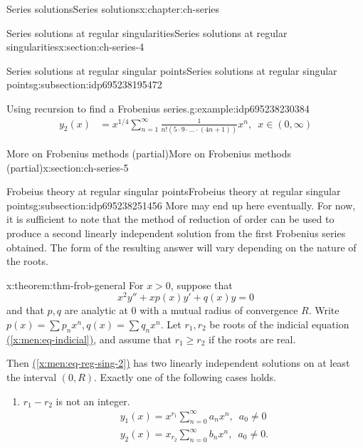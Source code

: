 \documentclass[oneside,10pt,]{book}
\newcommand{\xreffont}{\relax}
\numberwithin{equation}{section}
\numberwithin{equation}{section}
\newcommand{\amp}{&}
\begin{document}
\begin{chapterptx}{Series solutions}{}{Series solutions}{}{}{x:chapter:ch-series}
\begin{sectionptx}{Series solutions at regular singularities}{}{Series solutions at regular singularities}{}{}{x:section:ch-series-4}
\begin{subsectionptx}{Series solutions at regular singular points}{}{Series solutions at regular singular points}{}{}{g:subsection:idp695238195472}
\begin{example}{Using recursion to find a Frobenius series.}{g:example:idp695238230384}
\begin{align*}
y_2(x) \amp = x^{1/4} \sum_{n=1}^\infty \frac{1}{n!(5 \cdot 9 \cdot \ldots \cdot (4n + 1))} x^n, \,\,\, x \in (0,\infty)
\end{align*}
%
\end{example}
\end{subsectionptx}
\end{sectionptx}
%
%
\typeout{************************************************}
\typeout{************************************************}
%
\begin{sectionptx}{More on Frobenius methods (partial)}{}{More on Frobenius methods (partial)}{}{}{x:section:ch-series-5}
%
%
\typeout{************************************************}
\typeout{************************************************}
%
\begin{subsectionptx}{Frobeius theory at regular singular points}{}{Frobeius theory at regular singular points}{}{}{g:subsection:idp695238251456}
More may end up here eventually. For now, it is sufficient to note that the method of reduction of order can be used to produce a second linearly independent solution from the first Frobenius series obtained. The form of the resulting answer will vary depending on the nature of the roots.%
\begin{theorem}{}{}{x:theorem:thm-frob-general}%
For \(x > 0\), suppose that%
\begin{equation}
x^2 y'' + xp(x)y' + q(x)y = 0\label{x:men:eq-reg-sing-2}
\end{equation}
and that \(p, q\) are analytic at 0 with a mutual radius of convergence \(R\). Write \(p(x) = \sum p_n x^n, q(x) = \sum q_n x^n\). Let \(r_1, r_2\) be roots of the indicial equation \hyperref[x:men:eq-indicial]{({\xreffont\ref{x:men:eq-indicial}})}, and assume that \(r_1 \geq r_2\) if the roots are real.%
\par
Then \hyperref[x:men:eq-reg-sing-2]{({\xreffont\ref{x:men:eq-reg-sing-2}})} has two linearly independent solutions on at least the interval \((0,R)\). Exactly one of the following cases holds.%
\begin{enumerate}
\item{}\(r_1 - r_2\) is not an integer.%
\begin{gather*}
y_1(x) = x^{r_1} \sum_{n=0}^\infty a_n x^n, \,\,\, a_0 \neq 0\\
y_2(x) = x_{r_2} \sum_{n=0}^\infty b_n x^n, \,\,\, a_0 \neq 0.
\end{gather*}

\end{enumerate}
\end{theorem}
\end{subsectionptx}
\end{sectionptx}
\end{chapterptx}
\end{document}
